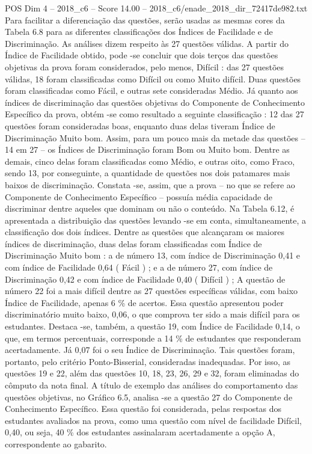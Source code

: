 \begin{textsample}{POS Dim 4 – 2018\_c6 – Score 14.00 – 2018\_c6/enade\_2018\_dir\_72417de982.txt}
Para facilitar a diferenciação das questões, serão usadas as mesmas cores da Tabela 6.8 para as diferentes classificações dos Índices de Facilidade e de Discriminação.
As análises dizem respeito às 27 questões válidas.
A partir do Índice de Facilidade obtido, pode -se concluir que dois terços das questões objetivas da prova foram considerados, pelo menos, Difícil : das 27 questões válidas, 18 foram classificadas como Difícil ou como Muito difícil.
Duas questões foram classificadas como Fácil, e outras sete consideradas Médio.
Já quanto aos índices de discriminação das questões objetivas do Componente de Conhecimento Específico da prova, obtém -se como resultado a seguinte classificação : 12 das 27 questões foram consideradas boas, enquanto duas delas tiveram Índice de Discriminação Muito bom.
Assim, para um pouco mais da metade das questões – 14 em 27 – os Índices de Discriminação foram Bom ou Muito bom.
Dentre as demais, cinco delas foram classificadas como Médio, e outras oito, como Fraco, sendo 13, por conseguinte, a quantidade de questões nos dois patamares mais baixos de discriminação.
Constata -se, assim, que a prova – no que se refere ao Componente de Conhecimento Específico – possuía média capacidade de discriminar dentre aqueles que dominam ou não o conteúdo.
Na Tabela 6.12, é apresentada a distribuição das questões levando -se em conta, simultaneamente, a classificação dos dois índices.
Dentre as questões que alcançaram os maiores índices de discriminação, duas delas foram classificadas com Índice de Discriminação Muito bom : a de número 13, com índice de Discriminação 0,41 e com índice de Facilidade 0,64 ( Fácil ) ; e a de número 27, com índice de Discriminação 0,42 e com índice de Facilidade 0,40 ( Difícil ) ; A questão de número 22 foi a mais difícil dentre as 27 questões específicas válidas, com baixo Índice de Facilidade, apenas 6 \% de acertos.
Essa questão apresentou poder discriminatório muito baixo, 0,06, o que comprova ter sido a mais difícil para os estudantes.
Destaca -se, também, a questão 19, com Índice de Facilidade 0,14, o que, em termos percentuais, corresponde a 14 \% de estudantes que responderam acertadamente.
Já 0,07 foi o seu Índice de Discriminação.
Tais questões foram, portanto, pelo critério Ponto-Bisserial, consideradas inadequadas.
Por isso, as questões 19 e 22, além das questões 10, 18, 23, 26, 29 e 32, foram eliminadas do cômputo da nota final.
A título de exemplo das análises do comportamento das questões objetivas, no Gráfico 6.5, analisa -se a questão 27 do Componente de Conhecimento Específico.
Essa questão foi considerada, pelas respostas dos estudantes avaliados na prova, como uma questão com nível de facilidade Difícil, 0,40, ou seja, 40 \% dos estudantes assinalaram acertadamente a opção A, correspondente ao gabarito.

\end{textsample}

